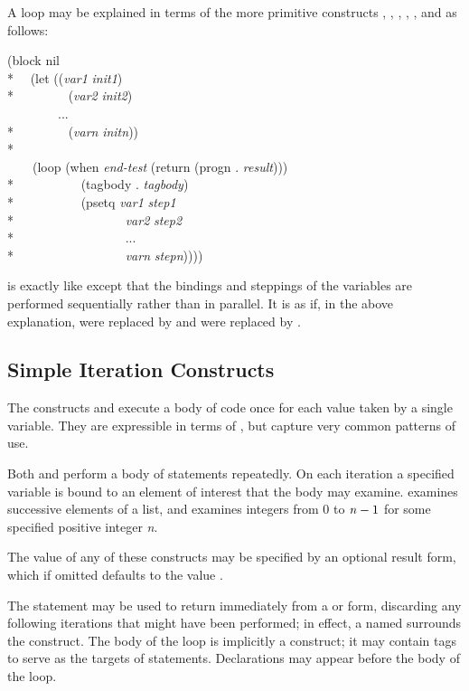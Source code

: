 \begin{defmac}
A  loop may be explained in terms of the more primitive constructs
, , , , ,
and  as follows:
\begin{lisp}
(block nil \\*
~~(let (({\it var1} {\it init1}) \\*
~~~~~~~~({\it var2} {\it init2}) \\
~~~~~~~~... \\*
~~~~~~~~({\it varn} {\it initn})) \\*
~~~~ \\
~~~~(loop (when {\it end-test} (return (progn . {\it result}))) \\*
~~~~~~~~~~(tagbody . {\it tagbody}) \\*
~~~~~~~~~~(psetq {\it var1} {\it step1} \\*
~~~~~~~~~~~~~~~~~{\it var2} {\it step2} \\*
~~~~~~~~~~~~~~~~~... \\*
~~~~~~~~~~~~~~~~~{\it varn} {\it stepn}))))
\end{lisp}
 is exactly like  except that the bindings and steppings
of the variables are performed sequentially rather than in parallel.
It is as if, in the above explanation,
 were replaced by  and  were replaced
by .
\end{defmac}

\subsection{Simple Iteration Constructs}

The constructs  and  execute a body of code
once for each value taken by a single variable.  They are expressible
in terms of , but capture very common patterns of use.

Both  and  perform
a body of statements repeatedly.  On each iteration a specified
variable is bound to an element of interest that the body may
examine.   examines successive elements of a list,
and  examines integers from 0 to ${\it n}-1$
for some specified positive integer {\it n}.

The value of any of these constructs may be specified by an optional result
form, which if omitted defaults to the value {\false}.

The  statement may be used to return
immediately from a  or  form,
discarding any following iterations
that might have been performed; in effect, a  named {\nil}
surrounds the construct.
The body of the loop is implicitly a  construct;
it may contain tags to serve as the targets of  statements.
Declarations may appear before the body of the loop.

